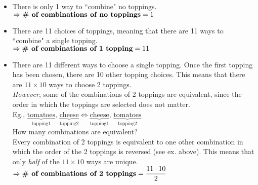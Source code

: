 \documentclass{article}
\begin{document}
\begin{itemize}
\item There is only 1 way to ``combine" no toppings.\\
$\Rightarrow\text{\bf\# of combinations of no toppings}=1$

\item There are 11 choices of toppings, meaning that there are 11 ways to ``combine" a single topping.\\
$\Rightarrow\text{\bf\# of combinations of 1 topping}=11$

\item There are 11 different ways to choose a single topping. Once the first topping has been chosen, there are 10 other topping choices. This means that there are $11\times 10$ ways to choose 2 toppings.\\[1ex]
\textit{However}, some of the combinations of 2 toppings are equivalent, since the order in which the toppings are selected does not matter.\\[1ex]
Eg., $\underbrace{\text{tomatoes}}_{\text{topping1}},\,\underbrace{\text{cheese}}_{\text{topping2}}\Leftrightarrow\underbrace{\text{cheese}}_{\text{topping1}},\,\underbrace{\text{tomatoes}}_{\text{topping2}}$\\[1em]
How many combinations are equivalent?\\[1ex]
Every combination of 2 toppings is equivalent to one other combination in which the order of the 2 toppings is reversed (see ex. above). This means that only \textit{half} of the $11\times 10$ ways are unique.\\[1ex]
$\Rightarrow\text{\bf\# of combinations of 2 toppings}=\dfrac{11\cdot 10}{2}$


\end{itemize}
\end{document}
